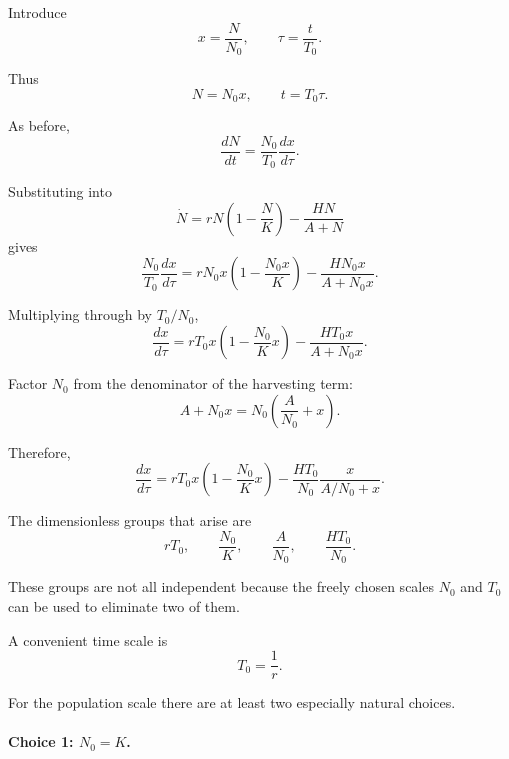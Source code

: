 \documentclass[12pt]{amsart}
\theoremstyle{conjecture}
\theoremstyle{definition}
\theoremstyle{question}
\theoremstyle{theorem}
\begin{document}
\begin{enumerate}[label=(\alph*)]
        Introduce
        \[
            x=\frac{N}{N_0},
            \qquad
            \tau=\frac{t}{T_0}.
        \]

        Thus
        \[
            N=N_0x,
            \qquad
            t=T_0\tau.
        \]

        As before,
        \[
            \frac{dN}{dt}
            =
            \frac{N_0}{T_0}\frac{dx}{d\tau}.
        \]

        Substituting into
        \[
            \dot N
            =
            rN\left(1-\frac{N}{K}\right)
            -
            \frac{HN}{A+N}
        \]
        gives
        \[
            \frac{N_0}{T_0}\frac{dx}{d\tau}
            =
            rN_0x
            \left(
                1-\frac{N_0x}{K}
            \right)
            -
            \frac{HN_0x}{A+N_0x}.
        \]

        Multiplying through by \(T_0/N_0\),
        \[
            \frac{dx}{d\tau}
            =
            rT_0x
            \left(
                1-\frac{N_0}{K}x
            \right)
            -
            \frac{HT_0x}{A+N_0x}.
        \]

        Factor \(N_0\) from the denominator of the harvesting term:
        \[
            A+N_0x
            =
            N_0
            \left(
                \frac{A}{N_0}+x
            \right).
        \]

        Therefore,
        \[
            \boxed{
                \frac{dx}{d\tau}
                =
                rT_0x
                \left(
                    1-\frac{N_0}{K}x
                \right)
                -
                \frac{HT_0}{N_0}
                \frac{x}{A/N_0+x}.
            }
        \]

        The dimensionless groups that arise are
        \[
            \boxed{
                rT_0,\qquad
                \frac{N_0}{K},\qquad
                \frac{A}{N_0},\qquad
                \frac{HT_0}{N_0}.
            }
        \]

        These groups are not all independent because the freely chosen scales
        \(N_0\) and \(T_0\) can be used to eliminate two of them.

        A convenient time scale is
        \[
            \boxed{
                T_0=\frac{1}{r}.
            }
        \]

        For the population scale there are at least two especially natural
        choices.

        \paragraph{Choice 1: \(N_0=K\).}


\end{enumerate}
\end{document}
